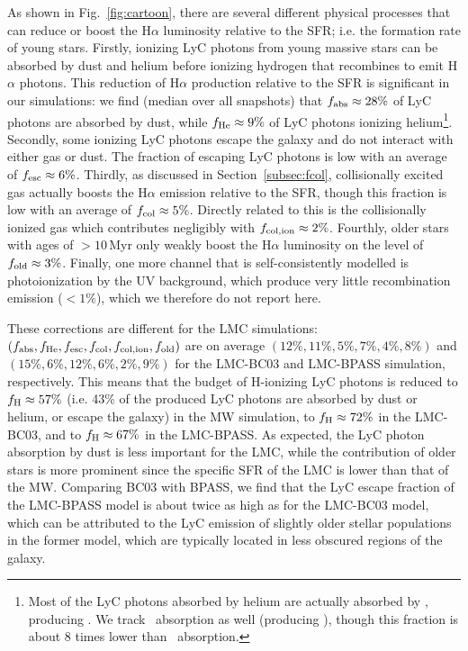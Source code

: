 \documentclass[fleqn,usenatbib]{mnras}
\newcommand\HeI{\ion{He}{I}} %
\newcommand\HeII{\ion{He}{II}} %
\newcommand\HeIII{\ion{He}{III}} %
\begin{document}
As shown in Fig.~\ref{fig:cartoon}, there are several different physical processes that can reduce or boost the H$\alpha$ luminosity relative to the SFR; i.e. the formation rate of young stars. Firstly, ionizing LyC photons from young massive stars can be absorbed by dust and helium before ionizing hydrogen that recombines to emit H$\alpha$ photons. This reduction of H$\alpha$ production relative to the SFR is significant in our simulations: we find (median over all snapshots) that $f_{\rm abs}\approx28\%$ of LyC photons are absorbed by dust, while $f_{\rm He}\approx9\%$ of LyC photons ionizing helium\footnote{Most of the LyC photons absorbed by helium are actually absorbed by \HeI, producing \HeII. We track \HeII\ absorption as well (producing \HeIII), though this fraction is about 8 times lower than \HeI\ absorption.}. Secondly, some ionizing LyC photons escape the galaxy and do not interact with either gas or dust. The fraction of escaping LyC photons is low with an average of $f_{\rm esc}\approx6\%$. Thirdly, as discussed in Section~\ref{subsec:fcol}, collisionally excited gas actually boosts the H$\alpha$ emission relative to the SFR, though this fraction is low with an average of $f_{\rm col}\approx5\%$. Directly related to this is the collisionally ionized gas which contributes negligibly with $f_{\rm col,ion}\approx2\%$. Fourthly, older stars with ages of $>10$\,Myr only weakly boost the H$\alpha$ luminosity on the level of $f_{\rm old}\approx3\%$. Finally, one more channel that is self-consistently modelled is photoionization by the UV background, which produce very little recombination emission ($<1\%$), which we therefore do not report here.

These corrections are different for the LMC simulations: $(f_{\rm abs}, f_{\rm He}, f_{\rm esc}, f_{\rm col}, f_{\rm col,ion}, f_{\rm old})$ are on average $(12\%, 11\%, 5\%, 7\%, 4\%, 8\%)$ and $(15\%, 6\%, 12\%, 6\%, 2\%, 9\%)$ for the LMC-BC03 and LMC-BPASS simulation, respectively. This means that the budget of H-ionizing LyC photons is reduced to $f_{\rm H}\approx57\%$ (i.e. 43\% of the produced LyC photons are absorbed by dust or helium, or escape the galaxy) in the MW simulation, to $f_{\rm H}\approx72\%$ in the LMC-BC03, and to $f_{\rm H}\approx67\%$ in the LMC-BPASS. As expected, the LyC photon absorption by dust is less important for the LMC, while the contribution of older stars is more prominent since the specific SFR of the LMC is lower than that of the MW. Comparing BC03 with BPASS, we find that the LyC escape fraction of the LMC-BPASS model is about twice as high as for the LMC-BC03 model, which can be attributed to the LyC emission of slightly older stellar populations in the former model, which are typically located in less obscured regions of the galaxy. 
\end{document}
